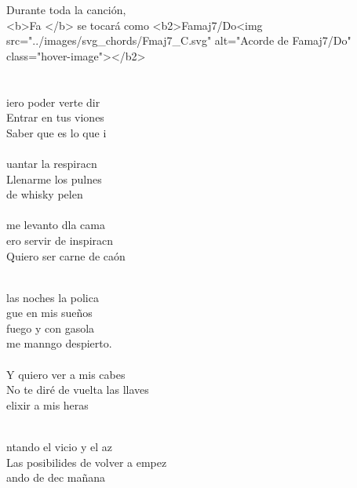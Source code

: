 \begin{cancion}[El Conticinio][Guitarricadelafuente]%
Durante toda la canción, \\
<b>Fa </b> se tocará como <b2>Famaj7/Do<img src="../images/svg_chords/Fmaj7_C.svg" alt="Acorde de Famaj7/Do" class="hover-image"></b2>\\
\jump\\
	    \chord{(}{***)}{     }\\
	iero poder verte dir\\
	Entrar en tus viones\\
	Saber que es lo que i\\
\jump\\
	uantar la respiracn\\
	Llenarme los pulnes\\
	de whisky pelen\\
\jump\\
	me levanto dla cama   \\
	ero servir de inspiracn \\
	Quiero ser carne de caón\\\jump\\
	\begin{chorus}%
	 las noches la polica \\
	gue en mis sueños\\
	 fuego y con gasola \\
	me manngo despierto.\\
\jump\\
	Y quiero ver a mis cabes\\
	No te diré de vuelta las llaves\\
	elixir a mis heras   \\
	\end{chorus}%
	\jump\\
	ntando el vicio y el az\\
	Las posibilides de volver a empez\\
	ando de dec mañana  \\

\end{cancion}
